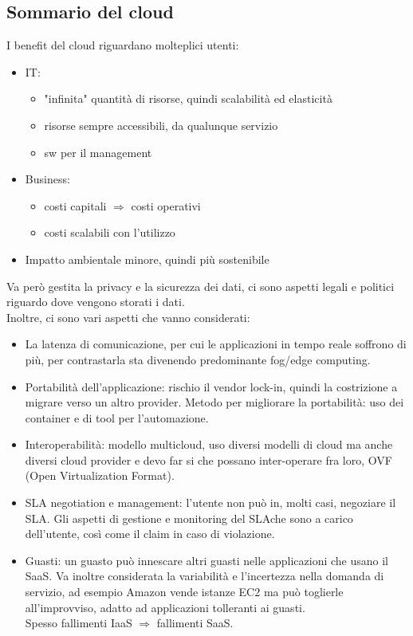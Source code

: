 \documentclass[16px]{article}
\begin{document}
\subsection{Sommario del cloud}
I benefit del cloud riguardano molteplici utenti:
\begin{itemize}
\item IT: 
\begin{itemize}
\item "infinita" quantità di risorse, quindi scalabilità ed elasticità
\item risorse sempre accessibili, da qualunque servizio
\item sw per il management
\end{itemize}
\item Business:
\begin{itemize}
\item costi capitali $\Rightarrow$ costi operativi
\item costi scalabili con l'utilizzo
\end{itemize}
\item Impatto ambientale minore, quindi più sostenibile
\end{itemize}
Va però gestita la privacy e la sicurezza dei dati, ci sono aspetti legali e politici riguardo dove vengono storati i dati.\\ Inoltre, ci sono vari aspetti che vanno considerati:
\begin{itemize}
\item La latenza di comunicazione, per cui le applicazioni in tempo reale soffrono di più, per contrastarla sta divenendo predominante fog/edge computing.
\item Portabilità dell'applicazione: rischio il vendor lock-in, quindi la costrizione a migrare verso un altro provider. Metodo per migliorare la portabilità: uso dei container e di tool per l'automazione.
\item Interoperabilità: modello multicloud, uso diversi modelli di cloud ma anche diversi cloud provider e devo far si che possano inter-operare fra loro, OVF (Open Virtualization Format).
\item SLA negotiation e management: l'utente non può in, molti casi, negoziare il SLA. Gli aspetti di gestione e monitoring del SLAche sono a carico dell'utente, così come il claim in caso di violazione.
\item Guasti: un guasto può innescare altri guasti nelle applicazioni che usano il SaaS. Va inoltre considerata la variabilità e l'incertezza nella domanda di servizio, ad esempio Amazon vende istanze EC2 ma può toglierle all'improvviso, adatto ad applicazioni tolleranti ai guasti.\\ Spesso fallimenti IaaS $\Rightarrow$ fallimenti SaaS.
\end{itemize}
\end{document}
